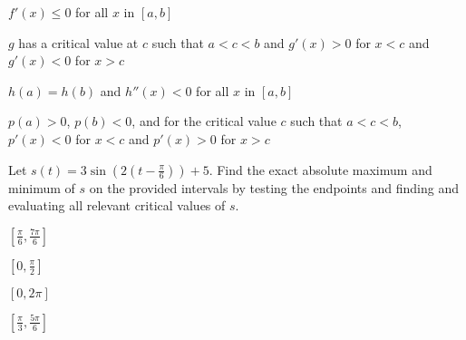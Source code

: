 \begin{exercises}
	\ba
		\item $f'(x) \le 0$ for all $x$ in $[a,b]$
		\item $g$ has a critical value at $c$ such that $a < c< b$ and $g'(x) > 0$ for $x < c$ and $g'(x) < 0$ for $x > c$
		\item $h(a) = h(b)$ and $h''(x) < 0$ for all $x$ in $[a,b]$
		\item $p(a) > 0$, $p(b) < 0$, and for the critical value $c$ such that $a < c < b$, $p'(x) < 0$ for $x < c$ and $p'(x) > 0$ for $x > c$
	\ea
	\item Let $s(t) = 3\sin(2(t-\frac{\pi}{6})) + 5.$  Find the exact absolute maximum and minimum of $s$ on the provided intervals by testing the endpoints and finding and evaluating all relevant critical values of $s$.
	\ba
		\item $[\frac{\pi}{6}, \frac{7\pi}{6}]$
		\item $[0, \frac{\pi}{2}]$
		\item $[0, 2\pi]$
		\item $[\frac{\pi}{3}, \frac{5\pi}{6}]$
	\ea	
\end{exercises}
\afterexercises